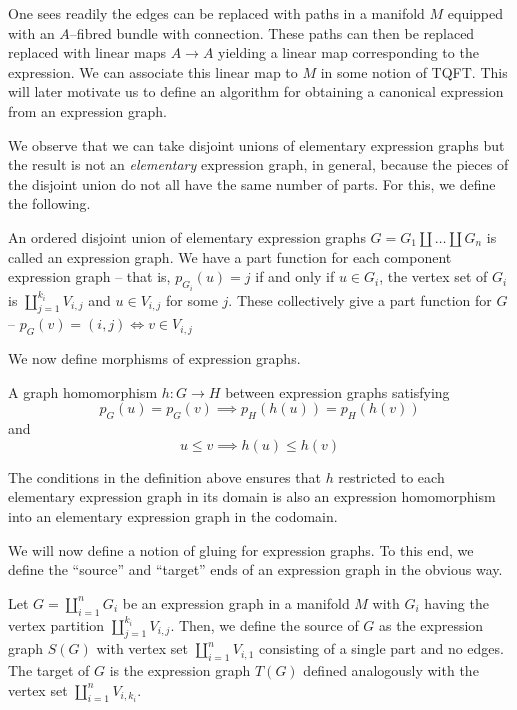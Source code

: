 \documentclass[./Thick_TQFTs_and_Quantum_Information.tex]{subfiles}
\begin{document}
\begin{exm}
One sees readily the edges can be replaced with paths in a manifold $M$ equipped
with an $A$--fibred bundle with connection. These paths can then be replaced
replaced with linear maps $A \to A$ yielding a linear map corresponding to the
expression. We can associate this linear map to $M$ in some notion of TQFT. This
will later motivate us to define an algorithm for obtaining a canonical
expression from an expression graph.
\end{exm}

We observe that we can take disjoint unions of elementary expression graphs but
the result is not an \textit{elementary} expression graph, in general, because
the pieces of the disjoint union do not all have the same number of parts. For
this, we define the following.

\begin{defn}
An ordered disjoint union of elementary expression graphs
$G = G_1 \amalg \dots \amalg G_n$ is called an expression graph. We have a part
function for each component expression graph -- that is, $p_{G_i}(u) = j$ if and
only if $u \in G_i$, the vertex set of $G_i$ is $\coprod_{j = 1}^{k_i} V_{i, j}$
and $u \in V_{i, j}$ for some $j$. These collectively give a part function for
$G$ -- $p_G(v) = (i, j) \iff v \in V_{i, j}$
\end{defn}

We now define morphisms of expression graphs.

\begin{defn}
A graph homomorphism $h : G \to H$ between expression graphs satisfying
\[
  p_G(u) = p_G(v) \implies p_H(h(u)) = p_H(h(v))
\]
and
\[
  u \leq v \implies h(u) \leq h(v)
\]
\end{defn}

\begin{rmk}
The conditions in the definition above ensures that $h$ restricted to each
elementary expression graph in its domain is also an expression homomorphism
into an elementary expression graph in the codomain.
\end{rmk}

We will now define a notion of gluing for expression graphs. To this end, we
define the ``source'' and ``target'' ends of an expression graph in the obvious
way.

\begin{defn}
Let $G = \coprod_{i = 1}^{n} G_i$ be an expression graph in a manifold $M$ with
$G_i$ having the vertex partition $\coprod_{j = 1}^{k_i} V_{i, j}$. Then, we
define the source of $G$ as the expression graph $S(G)$ with vertex set
$\coprod_{i = 1}^{n} V_{i, 1}$ consisting of a single part and no edges.
The target of $G$ is the expression graph $T(G)$ defined analogously with the
vertex set $\coprod_{i = 1}^{n} V_{i, k_i}$.
\end{defn}
\end{document}
